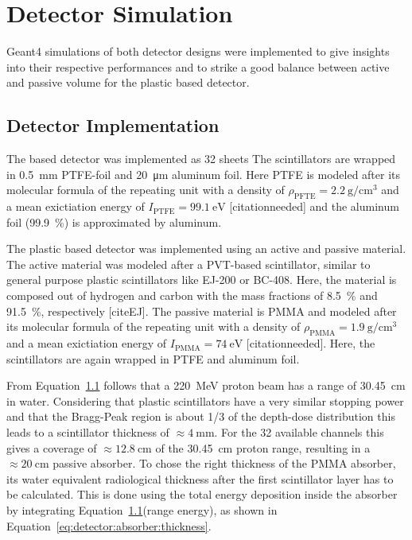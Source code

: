 \section{Detector Simulation}
Geant4 simulations of both detector designs were implemented to give insights into their respective performances and to strike a good balance between active and passive volume for the plastic based detector.

\subsection{Detector Implementation}
The  based detector was implemented as 32  sheets 
The scintillators are wrapped in \SI{0.5}{\mm} PTFE-foil and \SI{20}{\um} aluminum foil.
Here PTFE is modeled after its molecular formula of the repeating unit  with a density of $\rho_{\text{PFTE}}=\SI{2.2}{\gram\per\cm\cubed}$ and a mean exictiation energy of $I_{\text{PTFE}} = \SI{99.1}{\electronvolt}$  [citationneeded] and the aluminum foil (\SI{99.9}{\percent}) is approximated by aluminum. 

The plastic based detector was implemented using an active and passive material.
The active material was modeled after a PVT-based scintillator, similar to general purpose plastic scintillators like EJ-200 or BC-408.
Here, the material is composed out of hydrogen and carbon with the mass fractions of \SI{8.5}{\percent} and \SI{91.5}{\percent}, respectively [citeEJ].
The passive material is PMMA and modeled after its molecular formula of the repeating unit  with a density of $\rho_{\text{PMMA}}=\SI{1.9}{\gram\per\cm\cubed}$ and a mean exictiation energy of $I_{\text{PMMA}} = \SI{74}{\electronvolt}$ [citationneeded]. 
Here, the scintillators are again wrapped in PTFE and aluminum foil.

From Equation~\ref{} follows that a \SI{220}{\mega\electronvolt} proton beam has a range of \SI{30.45}{\cm} in water.
Considering that plastic scintillators have a very similar stopping power and that the Bragg-Peak region is about 1/3 of the depth-dose distribution this leads to a scintillator thickness of $\approx\SI{4}{\mm}$.
For the 32 available channels this gives a coverage of $\approx \SI{12.8}{\centi\meter}$ of the \SI{30.45}{\centi\meter} proton range, resulting in a $\approx\SI{20}{\cm}$ passive absorber.
To chose the right thickness of the PMMA absorber, its water equivalent radiological thickness after the first scintillator layer has to be calculated.
This is done using the total energy deposition inside the absorber by integrating Equation~\ref{}(range energy), as shown in Equation~\ref{eq:detector:absorber:thickness}.

